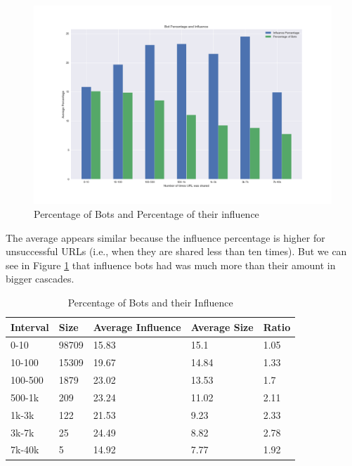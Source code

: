 \documentclass[letterpaper]{article}
\begin{document}
\begin{figure}
    \includegraphics[width=\linewidth]{images/bots_influence_vs_size.png}
    \caption{Percentage of Bots and Percentage of their influence}
    \label{fig:bots_influence_vs_size}
\end{figure}

The average appears similar because the influence percentage is higher for unsuccessful URLs (i.e., when they are shared less than ten times). But we can see in Figure \ref{fig:bots_influence_vs_size}
that influence bots had was much more than their amount in bigger cascades.

\begin{table}
    \centering
    \begin{tabular}{|l|l|l|l|l|}
    \hline
    \textbf{Interval} & \textbf{Size} & \textbf{Average Influence} & \textbf{Average Size} & \textbf{Ratio} \\ \hline
    0-10 & 98709 & 15.83 & 15.1 & 1.05 \\ \hline
    10-100 & 15309 & 19.67 & 14.84 & 1.33 \\ \hline
    100-500 & 1879 & 23.02 & 13.53 & 1.7 \\ \hline
    500-1k & 209 & 23.24 & 11.02 & 2.11 \\ \hline
    1k-3k & 122 & 21.53 & 9.23 & 2.33 \\ \hline
    3k-7k & 25 & 24.49 & 8.82 & 2.78 \\ \hline
    7k-40k & 5 & 14.92 & 7.77 & 1.92 \\ \hline
    \end{tabular}
    \caption{Percentage of Bots and their Influence}
    \label{tab:percentage_influence}
\end{table}
\end{document}
